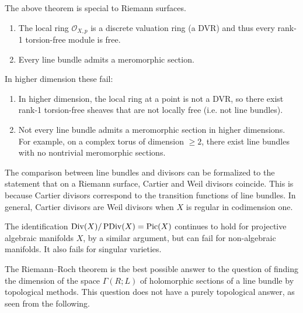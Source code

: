 \documentclass[12pt]{article}
\begin{document}
\begin{remark}
    The above theorem is special to Riemann surfaces. 
    \begin{enumerate}
        \item The local ring $\mathcal O_{X,p}$ is a discrete valuation ring (a DVR) and thus every rank-1 torsion-free module is free.
        \item Every line bundle admits a meromorphic section.
    \end{enumerate}

In higher dimension these fail:
    \begin{enumerate}
        \item In higher dimension, the local ring at a point is not a DVR, so there exist rank-1 torsion-free sheaves that are not locally free (i.e. not line bundles).
        \item Not every line bundle admits a meromorphic section in higher dimensions. For example, on a complex torus of dimension $\geq 2$, there exist line bundles with no nontrivial meromorphic sections.
\end{enumerate}
The comparison between line bundles and divisors can be formalized to the statement that on a Riemann surface, Cartier and Weil divisors coincide. This is because Cartier divisors correspond to the transition functions of line bundles. In general, Cartier divisors are Weil divisors when $X$ is regular in codimension one.

The identification $\operatorname{Div}(X)/\operatorname{PDiv}(X) = \operatorname{Pic}(X)$ continues to hold for projective algebraic manifolds $X$, by a similar argument, but can fail for non-algebraic manifolds. It also fails for singular varieties.
\end{remark}

The Riemann--Roch theorem is the best possible answer to the question of 
finding the dimension of the space $\Gamma(R;L)$ of holomorphic sections of a 
line bundle by topological methods. This question does not have a purely 
topological answer, as seen from the following.
\end{document}
